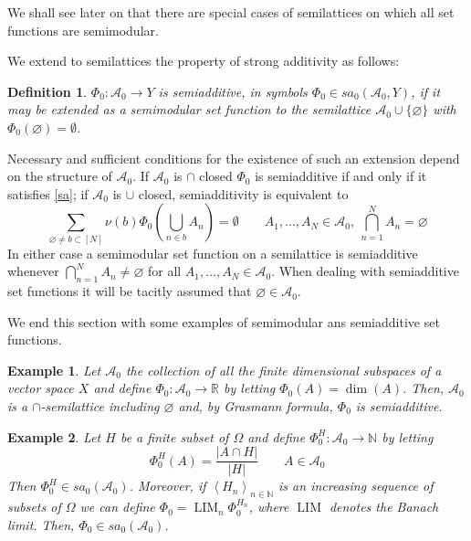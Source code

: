 \documentclass[11pt]{amsart}
\theoremstyle{plain}
\newtheorem{definition}{Definition}
\newtheorem{example}{Example}
\begin{document}
We shall see later on that there are special cases of semilattices on which all set 
functions are semimodular. 

We extend to semilattices the property of strong additivity as follows:

\begin{definition}
$\Phi_0:{\mathscr{A}}_0\to Y$ is semiadditive, in symbols $\Phi_0\in sa_0({\mathscr{A}}_0,Y)$, if it may 
be extended as a semimodular set function to the semilattice ${\mathscr{A}}_0\cup\{{\varnothing}\}$ 
with $\Phi_0({\varnothing})={\emptyset}$. 
\end{definition}

Necessary and sufficient conditions for the existence of such 
an extension depend on the structure of ${\mathscr{A}}_0$. If ${\mathscr{A}}_0$ is $\cap$ closed $\Phi_0$ 
is semiadditive if and only if it satisfies \eqref{sa}; if ${\mathscr{A}}_0$ is $\cup$ closed, 
semiadditivity is equivalent to 
\begin{equation}
\label{sa cup}
\sum_{{\varnothing}\ne b\subset[N]}\nu(b)\Phi_0\left(\bigcup_{n\in b}A_n\right)={\emptyset}
\qquad A_1,\ldots,A_N\in{\mathscr{A}}_0,\ \bigcap_{n=1}^NA_n={\varnothing} 
\end{equation} 
In either case a semimodular set function on a semilattice is semiadditive whenever 
$\bigcap_{n=1}^NA_n\neq{\varnothing}$ for all $A_1,\ldots,A_N\in{\mathscr{A}}_0$. When dealing
with semiadditive set functions it will be tacitly assumed that ${\varnothing}\in{\mathscr{A}}_0$.

We end this section with some examples of semimodular ans semiadditive set functions.
\begin{example}
Let ${\mathscr{A}}_0$ the collection of all the finite dimensional subspaces of a vector space $X$ 
and define $\Phi_0:{\mathscr{A}}_0\to{\mathbb{R}}$ by letting $\Phi_0(A)=\dim(A)$. Then, ${\mathscr{A}}_0$ is a 
$\cap$-semilattice including ${\varnothing}$ and, by Grasmann formula, $\Phi_0$ is semiadditive.
\end{example}

\begin{example}
Let $H$ be a finite subset of $\Omega$ and define $\Phi_0^H:{\mathscr{A}}_0\to{\mathbb{N}}$ by letting 
\begin{equation*}
\Phi_0^H(A)=\frac{{\vert {A\cap H}\vert}}{{\vert H\vert}}\qquad A\in{\mathscr{A}}_0
\end{equation*}
Then $\Phi_0^H\in sa_0({\mathscr{A}}_0)$. Moreover, if ${{{\left\langle {{H}}_{{{n}}}\right\rangle_{{{n}}\in {\mathbb{N}}} }}}$ is an increasing
sequence of subsets of $\Omega$ we can define $\Phi_0=\operatorname*{LIM}_n\Phi_0^{H_n}$,
where $\operatorname*{LIM}$ denotes the Banach limit. Then, $\Phi_0\in sa_0({\mathscr{A}}_0)$.
\end{example}
\end{document}
